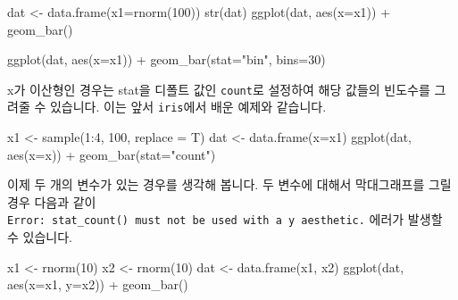 \documentclass[
]{book}
\newenvironment{Shaded}{\begin{snugshade}}{\end{snugshade}}
\newcommand{\AttributeTok}[1]{\textcolor[rgb]{0.77,0.63,0.00}{#1}}
\newcommand{\DecValTok}[1]{\textcolor[rgb]{0.00,0.00,0.81}{#1}}
\newcommand{\FunctionTok}[1]{\textcolor[rgb]{0.00,0.00,0.00}{#1}}
\newcommand{\NormalTok}[1]{#1}
\newcommand{\OtherTok}[1]{\textcolor[rgb]{0.56,0.35,0.01}{#1}}
\newcommand{\SpecialCharTok}[1]{\textcolor[rgb]{0.00,0.00,0.00}{#1}}
\newcommand{\StringTok}[1]{\textcolor[rgb]{0.31,0.60,0.02}{#1}}
\begin{document}
\begin{Shaded}
\begin{Highlighting}[]
\NormalTok{dat }\OtherTok{\textless{}{-}} \FunctionTok{data.frame}\NormalTok{(}\AttributeTok{x1=}\FunctionTok{rnorm}\NormalTok{(}\DecValTok{100}\NormalTok{))}
\FunctionTok{str}\NormalTok{(dat)}
\FunctionTok{ggplot}\NormalTok{(dat, }\FunctionTok{aes}\NormalTok{(}\AttributeTok{x=}\NormalTok{x1)) }\SpecialCharTok{+}
  \FunctionTok{geom\_bar}\NormalTok{()}

\FunctionTok{ggplot}\NormalTok{(dat, }\FunctionTok{aes}\NormalTok{(}\AttributeTok{x=}\NormalTok{x1)) }\SpecialCharTok{+}
  \FunctionTok{geom\_bar}\NormalTok{(}\AttributeTok{stat=}\StringTok{"bin"}\NormalTok{, }\AttributeTok{bins=}\DecValTok{30}\NormalTok{)}
\end{Highlighting}
\end{Shaded}

x가 이산형인 경우는 stat을 디폴트 값인 \texttt{count}로 설정하여 해당 값들의 빈도수를 그려줄 수 있습니다. 이는 앞서 \texttt{iris}에서 배운 예제와 같습니다.

\begin{Shaded}
\begin{Highlighting}[]
\NormalTok{x1 }\OtherTok{\textless{}{-}} \FunctionTok{sample}\NormalTok{(}\DecValTok{1}\SpecialCharTok{:}\DecValTok{4}\NormalTok{, }\DecValTok{100}\NormalTok{, }\AttributeTok{replace =}\NormalTok{ T)}
\NormalTok{dat }\OtherTok{\textless{}{-}} \FunctionTok{data.frame}\NormalTok{(}\AttributeTok{x=}\NormalTok{x1)}
\FunctionTok{ggplot}\NormalTok{(dat, }\FunctionTok{aes}\NormalTok{(}\AttributeTok{x=}\NormalTok{x)) }\SpecialCharTok{+}
  \FunctionTok{geom\_bar}\NormalTok{(}\AttributeTok{stat=}\StringTok{"count"}\NormalTok{)}
\end{Highlighting}
\end{Shaded}

이제 두 개의 변수가 있는 경우를 생각해 봅니다. 두 변수에 대해서 막대그래프를 그릴 경우 다음과 같이 \texttt{Error:\ stat\_count()\ must\ not\ be\ used\ with\ a\ y\ aesthetic.} 에러가 발생할 수 있습니다.

\begin{Shaded}
\begin{Highlighting}[]
\NormalTok{x1 }\OtherTok{\textless{}{-}} \FunctionTok{rnorm}\NormalTok{(}\DecValTok{10}\NormalTok{)}
\NormalTok{x2 }\OtherTok{\textless{}{-}} \FunctionTok{rnorm}\NormalTok{(}\DecValTok{10}\NormalTok{)}
\NormalTok{dat }\OtherTok{\textless{}{-}} \FunctionTok{data.frame}\NormalTok{(x1, x2)}
\FunctionTok{ggplot}\NormalTok{(dat, }\FunctionTok{aes}\NormalTok{(}\AttributeTok{x=}\NormalTok{x1, }\AttributeTok{y=}\NormalTok{x2)) }\SpecialCharTok{+}
  \FunctionTok{geom\_bar}\NormalTok{()}
\end{Highlighting}
\end{Shaded}
\end{document}
